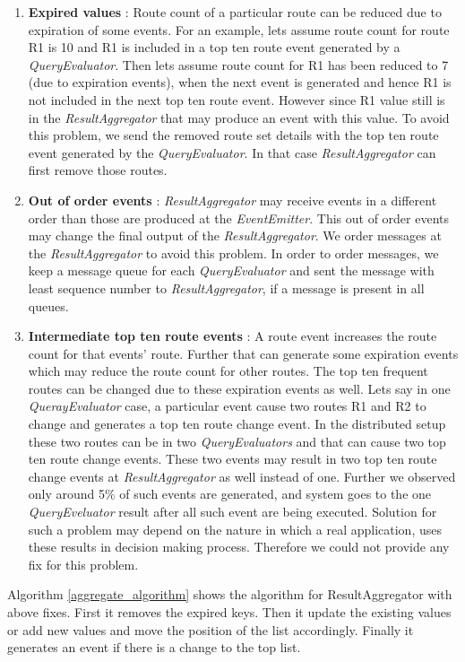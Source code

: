 \begin{enumerate}
	\item \textbf{Expired values} : Route count of a particular route can be reduced due to expiration of some events. For an example, lets assume route count for route R1 is 10 and R1 is included in a top ten route event generated by a \textit{QueryEvaluator}. Then lets assume route count for R1 has been reduced to 7 (due to expiration events), when the next event is generated and hence R1 is not included in the next top ten route event. However since R1 value still is in the \textit{ResultAggregator} that may produce an event with this value. To avoid this problem, we send the removed route set details with the top ten route event generated by the \textit{QueryEvaluator}. In that case \textit{ResultAggregator} can first remove those routes.
	\item \textbf{Out of order events} : \textit{ResultAggregator} may receive events in a different order than those are produced at the \textit{EventEmitter}. This out of order events may change the final output of the \textit{ResultAggregator}. We order messages at the \textit{ResultAggregator} to avoid this problem. In order to order messages, we keep a message queue for each \textit{QueryEvaluator} and sent the message with least sequence number to \textit{ResultAggregator},  if a message is present in all queues. 
	\item \textbf{Intermediate top ten route events} : A route event increases the route count for that events' route. Further that can generate some expiration events which may reduce the route count for other routes. The top ten frequent routes can be changed due to these expiration events as well. Lets say in one \textit{QuerayEvaluator} case, a particular event cause two routes R1 and R2 to change and generates a top ten route change event. In the distributed setup these two routes can be in two \textit{QueryEvaluators} and that can cause two top ten route change events. These two events may result in two top ten route change events at \textit{ResultAggregator} as well instead of one. Further we observed only around 5\% of such events are generated, and system goes to the one \textit{QueryEveluator} result after all such event are being executed. Solution for such a problem may depend on the nature in which a real application, uses these results in decision making process. Therefore we could not provide any fix for this problem.
\end{enumerate}

Algorithm \ref{aggregate_algorithm} shows the algorithm for ResultAggregator with above fixes. First it removes the expired keys. Then it update the existing values or add new values and move the position of the list accordingly. Finally it generates an event if there is a change to the top list.


